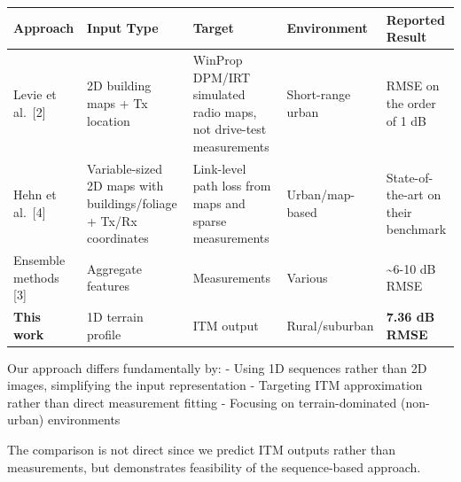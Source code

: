 \documentclass[
]{article}
\begin{document}
\begin{longtable}[]{@{}
  >{\raggedright\arraybackslash}p{}
  >{\raggedright\arraybackslash}p{}
  >{\raggedright\arraybackslash}p{}
  >{\raggedright\arraybackslash}p{}
  >{\raggedright\arraybackslash}p{}@{}}
\toprule\noalign{}
\begin{minipage}[b]{\linewidth}\raggedright
Approach
\end{minipage} & \begin{minipage}[b]{\linewidth}\raggedright
Input Type
\end{minipage} & \begin{minipage}[b]{\linewidth}\raggedright
Target
\end{minipage} & \begin{minipage}[b]{\linewidth}\raggedright
Environment
\end{minipage} & \begin{minipage}[b]{\linewidth}\raggedright
Reported Result
\end{minipage} \\
\midrule\noalign{}
\endhead
\bottomrule\noalign{}
\endlastfoot
Levie et al.~{[}2{]} & 2D building maps + Tx location & WinProp DPM/IRT
simulated radio maps, not drive-test measurements & Short-range urban &
RMSE on the order of 1 dB \\
Hehn et al.~{[}4{]} & Variable-sized 2D maps with buildings/foliage +
Tx/Rx coordinates & Link-level path loss from maps and sparse
measurements & Urban/map-based & State-of-the-art on their benchmark \\
Ensemble methods {[}3{]} & Aggregate features & Measurements & Various &
\textasciitilde6-10 dB RMSE \\
\textbf{This work} & 1D terrain profile & ITM output & Rural/suburban &
\textbf{7.36 dB RMSE} \\
\end{longtable}

Our approach differs fundamentally by: - Using 1D sequences rather than
2D images, simplifying the input representation - Targeting ITM
approximation rather than direct measurement fitting - Focusing on
terrain-dominated (non-urban) environments

The comparison is not direct since we predict ITM outputs rather than
measurements, but demonstrates feasibility of the sequence-based
approach.
\end{document}
